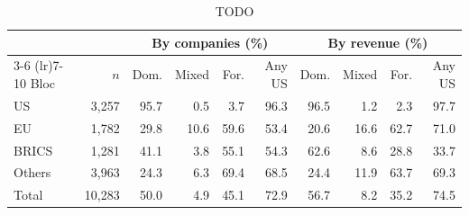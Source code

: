 \begin{table}[t]
\centering
\scriptsize
\caption{TODO}
\label{tab:dependency}
\setlength{\tabcolsep}{3pt}
\begin{tabular}{lrrrrrrrrr}
\toprule
 & & \multicolumn{4}{c}{By companies (\%)} & \multicolumn{4}{c}{By revenue (\%)} \\
\cmidrule(lr){3-6} \cmidrule(lr){7-10}
Bloc & $n$ & Dom. & Mixed & For. & Any US & Dom. & Mixed & For. & Any US \\
\midrule
US & 3,257 & 95.7 & 0.5 & 3.7 & 96.3 & 96.5 & 1.2 & 2.3 & 97.7 \\
EU & 1,782 & 29.8 & 10.6 & 59.6 & 53.4 & 20.6 & 16.6 & 62.7 & 71.0 \\
BRICS & 1,281 & 41.1 & 3.8 & 55.1 & 54.3 & 62.6 & 8.6 & 28.8 & 33.7 \\
Others & 3,963 & 24.3 & 6.3 & 69.4 & 68.5 & 24.4 & 11.9 & 63.7 & 69.3 \\
\midrule
Total & 10,283 & 50.0 & 4.9 & 45.1 & 72.9 & 56.7 & 8.2 & 35.2 & 74.5 \\
\bottomrule
\end{tabular}
\end{table}
